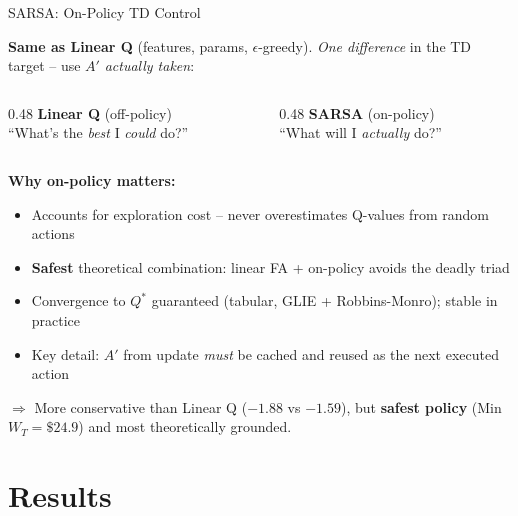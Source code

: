 \documentclass[aspectratio=169, 11pt]{beamer}
\begin{document}
\begin{frame}{SARSA: On-Policy TD Control}

\textbf{Same as Linear Q} (features, params, $\epsilon$-greedy). \textit{One difference} in the TD target -- use $A'$ \textit{actually taken}:

\begin{columns}[T]
\begin{column}{0.48\textwidth}
\centering
\textbf{Linear Q} (off-policy)\\[0.2em]
\vspace{0.15em}
``What's the \textit{best} I \textit{could} do?''
\end{column}
\begin{column}{0.48\textwidth}
\centering
\textbf{SARSA} (on-policy)\\[0.2em]
\vspace{0.15em}
``What will I \textit{actually} do?''
\end{column}
\end{columns}

\vspace{0.2em}
\textbf{Why on-policy matters:}
\begin{itemize}
    \item Accounts for exploration cost -- never overestimates Q-values from random actions
    \item \textbf{Safest} theoretical combination: linear FA + on-policy avoids the deadly triad
    \item Convergence to $Q^*$ guaranteed (tabular, GLIE + Robbins-Monro); stable in practice
    \item Key detail: $A'$ from update \textit{must} be cached and reused as the next executed action
\end{itemize}

\vspace{0.15em}
$\Rightarrow$ More conservative than Linear Q ($-1.88$ vs $-1.59$), but \textbf{safest policy} (Min $W_T = \$24.9$) and most theoretically grounded.
\end{frame}
\section{Results}
\end{document}
